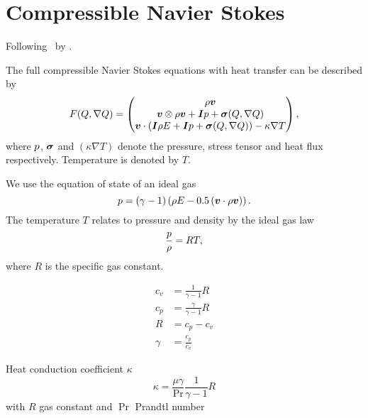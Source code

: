 \section{Compressible Navier Stokes}
Following~\cite{dumbser2010arbitrary} by \citeauthor{dumbser2010arbitrary}.

The full compressible Navier Stokes equations with heat transfer can be described by
\begin{equation}
  F(Q, \nabla Q) = 
  \begin{pmatrix}
    \rho \bm{v} \\
    \bm{v}  \otimes \rho \bm{v} + \bm{I} p + \bm{\sigma} (Q, \nabla Q)  \\
    \bm{v} \cdot (\bm{I} \rho E + \bm{I} p + \bm{\sigma} (Q, \nabla Q)) - \kappa \nabla T
  \end{pmatrix},
\end{equation}
where $p$, $\bm{\sigma}$ and $(\kappa \nabla T)$ denote the pressure, stress tensor and heat flux respectively.
Temperature is denoted by $T$.

We use the equation of state of an ideal gas
\begin{equation}
  p = (\gamma - 1) \left(\rho E - 0.5 \left(\bm{v} \cdot \rho \bm{v} \right) \right).
\end{equation}
The temperature $T$ relates to pressure and density by the ideal gas law
\begin{equation}
  \label{eq:temperature}
 \frac{p}{\rho} = RT,
\end{equation}
where $R$ is the specific gas constant.

\begin{align}
  c_v &= \frac{1}{\gamma - 1} R \\
  c_p &= \frac{\gamma}{\gamma - 1} R\\
  R &= c_p - c_v\\
  \gamma &= \frac{c_p}{c_v}
\end{align}

Heat conduction coefficient $\kappa$
\begin{equation}
  \label{eq:heat-conduction-coeff}
  \kappa = \frac{\mu \gamma}{\Pr} \frac{1}{\gamma - 1} R
\end{equation}
with $R$ gas constant and $\Pr$ Prandtl number


